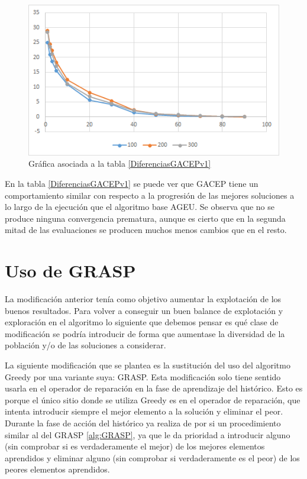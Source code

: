 \begin{figure}[h]
		\centering
		\includegraphics[scale=1]{imagenes/Experimental/DiferenciasGACEPv1.png}
        \caption{Gráfica asociada a la tabla \ref{DiferenciasGACEPv1}}
        \label{fig:DiferenciasGACEPv1}
\end{figure}

En la tabla \ref{DiferenciasGACEPv1} se puede ver que GACEP tiene un comportamiento similar con respecto a la progresión de las mejores soluciones a lo largo de la ejecución que el algoritmo base AGEU. 
Se observa que no se produce ninguna convergencia prematura, aunque es cierto que en la segunda mitad de las evaluaciones se producen muchos menos cambios que en el resto. 



\section{Uso de GRASP}

La modificación anterior tenía como objetivo aumentar la explotación de los buenos resultados. 
Para volver a conseguir un buen balance de explotación y exploración en el algoritmo lo siguiente que debemos pensar es qué clase de modificación se podría introducir de forma que aumentase la diversidad de la población y/o de las soluciones a considerar. 

La siguiente modificación que se plantea es la sustitución del uso del algoritmo Greedy por una variante suya: GRASP. 
Esta modificación solo tiene sentido usarla en el operador de reparación en la fase de aprendizaje del histórico. 
Esto es porque el único sitio donde se utiliza Greedy es en el operador de reparación, que intenta introducir siempre el mejor elemento a la solución y eliminar el peor. 
Durante la fase de acción del histórico ya realiza de por si un procedimiento similar al del GRASP \ref{alg:GRASP}, ya que le da prioridad a introducir alguno (sin comprobar si es verdaderamente el mejor) de los mejores elementos aprendidos y eliminar alguno (sin comprobar si verdaderamente es el peor) de los peores elementos aprendidos. 

